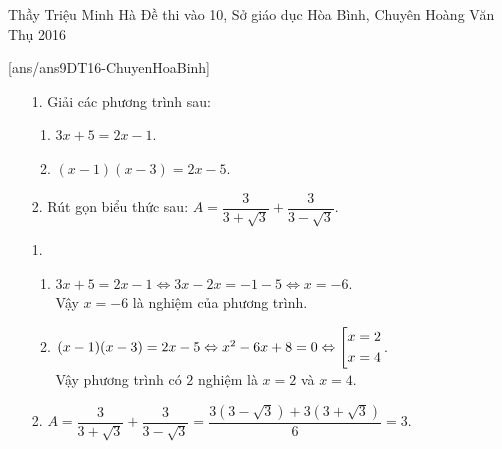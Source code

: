 \begin{name}
{Thầy  Triệu Minh Hà}
{Đề thi vào 10, Sở giáo dục Hòa Bình, Chuyên Hoàng Văn Thụ 2016}
\end{name}
\setcounter{ex}{0}
[ans/ans9DT16-ChuyenHoaBinh]
\begin{ex}%
	\hfill
	\begin{enumerate}
		\item[1.] Giải các phương trình sau:
		\begin{enumerate}
			\item $3x+5=2x-1$.
			\item $(x-1)(x-3)=2x-5$.
		\end{enumerate}
	\item[2.] Rút gọn biểu thức sau: $A=\dfrac{3}{3+\sqrt{3}}+\dfrac{3}{3-\sqrt{3}}$.
	\end{enumerate}
\loigiai
{\begin{enumerate}
		\item[1.] 
		\begin{enumerate}
			\item $3x+5=2x-1\Leftrightarrow 3x-2x=-1-5\Leftrightarrow x=-6$.\\
			Vậy $x=-6$ là nghiệm của phương trình.
			\item $(x-1)(x-3)=2x-5\Leftrightarrow x^2-6x+8=0\Leftrightarrow \left[\begin{aligned}&x=2\\&x=4\end{aligned}\right.$.\\
			Vậy phương trình có $2$ nghiệm là $x=2$ và $x=4$.
		\end{enumerate}
		\item[2.]  $A=\dfrac{3}{3+\sqrt{3}}+\dfrac{3}{3-\sqrt{3}}=\dfrac{3(3-\sqrt{3})+3(3+\sqrt{3})}{6}=3$.\\
	\end{enumerate}
}
\end{ex}
